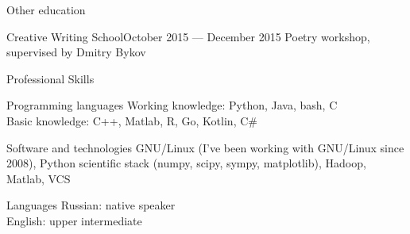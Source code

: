 \documentclass{resume}
\begin{document}
\begin{rSection}{Other education}
  \begin{rSubsection}{Creative Writing School}{October 2015 --- December 2015}{} 
    Poetry workshop, supervised by Dmitry Bykov
  \end{rSubsection}
\end{rSection}

\begin{rSection}{Professional Skills}
  \begin{rSubsection}{Programming languages}{}{}
    Working knowledge: Python, Java, bash, C \\
    Basic knowledge: C++, Matlab, R, Go, Kotlin, C\#
  \end{rSubsection}

  \begin{rSubsection}{Software and technologies}{}{}
    GNU/Linux (I've been working with GNU/Linux since 2008), Python scientific stack (numpy, scipy, sympy, matplotlib), Hadoop, Matlab, VCS
  \end{rSubsection}

  \begin{rSubsection}{Languages}{}{}
    Russian: native speaker \\
    English: upper intermediate
  \end{rSubsection}
\end{rSection}
\end{document}
